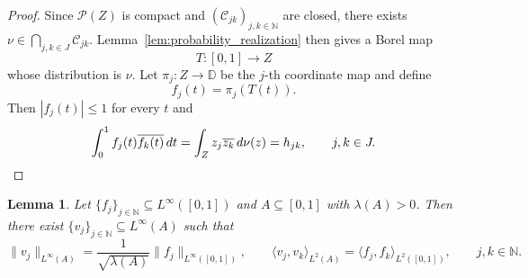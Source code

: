 \documentclass[reqno,a4paper,12pt]{amsart}
\numberwithin{equation}{section}
\newtheorem{lemma}[definition]{Lemma}
\def\N{{\mathbb N}}
\def\D{{\mathbb D}}
\newcommand\1{\mathds{1}}
\begin{document}
\begin{proof}
Since $\mathcal P(Z)$ is compact and $(\mathcal C_{jk})_{j,k\in\N}$ are closed, there exists $\nu\in\bigcap_{j,k\in J}\mathcal C_{jk}$. Lemma~\ref{lem:probability_realization} then gives a Borel map
\begin{equation*}
T:[0,1]\to Z
\end{equation*}
whose distribution is $\nu$. Let $\pi_j:Z\to\D$
be the $j$-th coordinate map and define
\begin{equation*}
f_j(t)=\pi_j(T(t)).
\end{equation*}
Then $|f_j(t)|\le1$ for every $t$ and
\begin{equation*}
\int_0^1 f_j(t)\overline{f_k(t)}\,dt
=
\int_Z z_j \overline{z_k}\, d\nu(z)
=
h_{jk},
\qquad j,k\in J.\qedhere
\end{equation*}
\end{proof}
\begin{lemma}\label{lem:rescaling}
    Let $\{f_j\}_{j\in\N}\subseteq L^\infty([0,1])$ and $A\subseteq [0,1]$ with $\lambda(A)>0$. Then there exist $\{v_j\}_{j\in\N}\subseteq L^\infty(A)$ such that 
    \begin{equation*}
        \|v_j\|_{L^\infty(A)} = \frac{1}{\sqrt{\lambda(A)}}\|f_j\|_{L^\infty([0,1])},
        \qquad 
        \langle v_j, v_k\rangle_{L^2(A)}
        =
        \langle f_j, f_k\rangle_{L^2([0,1])},
        \qquad
        j,k\in \N.
    \end{equation*}
\end{lemma}
\end{document}
